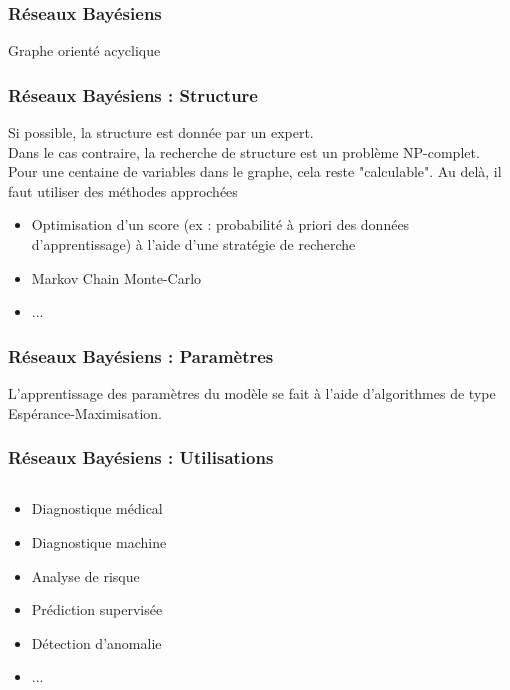 \begin{frame}
  \frametitle{Réseaux Bayésiens}
  Graphe orienté acyclique
\end{frame}

\begin{frame}
  \frametitle{Réseaux Bayésiens : Structure}
  Si possible, la structure est donnée par un expert. \\
  Dans le cas contraire, la recherche de structure est un problème NP-complet. Pour une centaine de variables dans le graphe, cela reste "calculable". Au delà, il faut utiliser des méthodes approchées
  \begin{itemize}
  \item Optimisation d'un score (ex : probabilité à priori des données d'apprentissage) à l'aide d'une stratégie de recherche
  \item Markov Chain Monte-Carlo
  \item ...
  \end{itemize}
\end{frame}

\begin{frame}
  \frametitle{Réseaux Bayésiens : Paramètres}
  L'apprentissage des paramètres du modèle se fait à l'aide d'algorithmes de type Espérance-Maximisation.
\end{frame}

\begin{frame}
  \frametitle{Réseaux Bayésiens : Utilisations}
  \begin{columns}
    \begin{column}{0.5\linewidth}
      \begin{itemize}
      \item Diagnostique médical
      \item Diagnostique machine
      \item Analyse de risque
      \item Prédiction supervisée
      \item Détection d'anomalie
      \item ...
      \end{itemize}
    \end{column}
    \begin{column}{0.5\linewidth}
    \end{column}
  \end{columns}
\end{frame}
